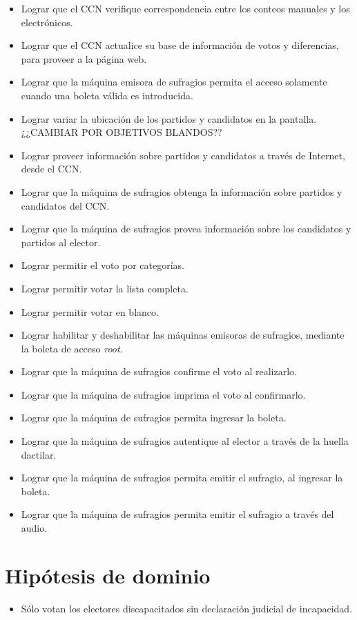 \documentclass[spanish, 10pt,a4paper]{article}
\numberwithin{equation}{section} %
\begin{document}
\begin{itemize}
\item Lograr que el CCN verifique correspondencia entre los conteos manuales y los electrónicos.
\item Lograr que el CCN actualice su base de información de votos y diferencias, para proveer a la página web.
\item Lograr que la máquina emisora de sufragios permita el acceso solamente cuando una boleta válida es introducida.
\item Lograr variar la ubicación de los partidos y candidatos en la pantalla. ¿¿CAMBIAR POR OBJETIVOS BLANDOS??
\item Lograr proveer información sobre partidos y candidatos a través de Internet, desde el CCN.
\item Lograr que la máquina de sufragios obtenga la información sobre partidos y candidatos del CCN.
\item Lograr que la máquina de sufragios provea información sobre los candidatos y partidos al elector.
\item Lograr permitir el voto por categorías.
\item Lograr permitir votar la lista completa.
\item Lograr permitir votar en blanco.
\item Lograr habilitar y deshabilitar las máquinas emisoras de sufragios, mediante la boleta de acceso \emph{root}.
\item Lograr que la máquina de sufragios confirme el voto al realizarlo.
\item Lograr que la máquina de sufragios imprima el voto al confirmarlo.
\item Lograr que la máquina de sufragios permita ingresar la boleta.
\item Lograr que la máquina de sufragios autentique al elector a través de la huella dactilar.
\item Lograr que la máquina de sufragios permita emitir el sufragio, al ingresar la boleta.
\item Lograr que la máquina de sufragios permita emitir el sufragio a través del audio.

\end{itemize}

\section{Hipótesis de dominio}

\begin{itemize}
\item Sólo votan los electores discapacitados sin declaración judicial de incapacidad.
\end{itemize}
\end{document}
